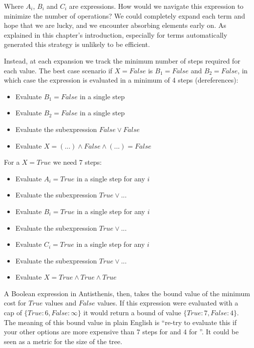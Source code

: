 Where \(A_i\), \(B_i\) and \(C_i\) are expressions. How would we
navigate this expression to minimize the number of operations?  We
could completely expand each term and hope that we are lucky, and we
encounter absorbing elements early on. As explained in this chapter's
introduction, especially for terms automatically generated this
strategy is unlikely to be efficient.

Instead, at each expansion we track the minimum number of steps
required for each value. The best case scenario if
\(X = \mathit{False}\) is \(B_1 = \mathit{False}\) and \(B_2 = \mathit{False}\), in
which case the expression is evaluated in a minimum of 4 steps
(dereferences):

\begin{itemize}
\item Evaluate \(B_1 = False\) in a single step
\item Evaluate \(B_2 = False\) in a single step
\item Evaluate the subexpression \(False \lor False\)
\item Evaluate \(X = (...) \land False \land (...) = False\)
\end{itemize}

For a \(X = \mathit{True}\) we need 7 steps:

\begin{itemize}
\item Evaluate \(A_i = True\) in a single step for any \(i\)
\item Evaluate the subexpression \(True \lor ...\)
\item Evaluate \(B_i = True\) in a single step for any \(i\)
\item Evaluate the subexpression \(True \lor ...\)
\item Evaluate \(C_i = True\) in a single step for any \(i\)
\item Evaluate the subexpression \(True \lor ...\)
\item Evaluate \(X = True \land True \land True\)
\end{itemize}

A Boolean expression in Antisthenis, then, takes the bound value of
the minimum cost for \(True\) values and \(False\) values. If this
expression were evaluated with a cap of
\(\{True: 6, False: \infty \}\) it would return a bound of value
\(\{True: 7, False: 4 \}\). The meaning of this bound value in plain
English is ``re-try to evaluate this if your other options are more
expensive than 7 steps for  and 4 for ''. It
could be seen as a metric for the size of the tree.

